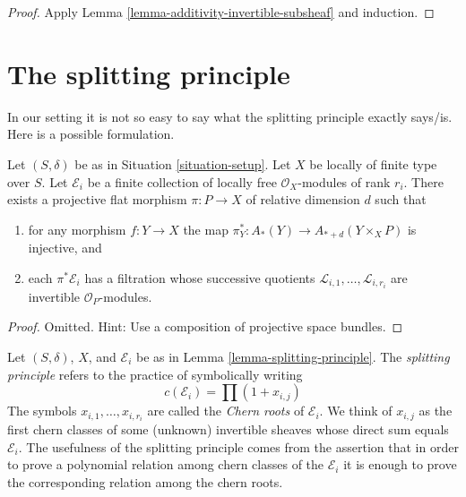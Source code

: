 \begin{proof}
Apply Lemma \ref{lemma-additivity-invertible-subsheaf} and induction.
\end{proof}





\section{The splitting principle}
\label{section-splitting-principle}

\noindent
In our setting it is not so easy to say what the splitting principle
exactly says/is. Here is a possible formulation.

\begin{lemma}
\label{lemma-splitting-principle}
Let $(S, \delta)$ be as in Situation \ref{situation-setup}. Let $X$ be locally
of finite type over $S$. Let $\mathcal{E}_i$ be a finite collection of
locally free $\mathcal{O}_X$-modules of rank $r_i$. There exists a projective
flat morphism $\pi : P \to X$ of relative dimension $d$ such that
\begin{enumerate}
\item for any morphism $f : Y \to X$ the map
$\pi_Y^* : A_*(Y) \to A_{* + d}(Y \times_X P)$ is injective, and
\item each $\pi^*\mathcal{E}_i$ has a filtration
whose successive quotients $\mathcal{L}_{i, 1}, \ldots, \mathcal{L}_{i, r_i}$
are invertible ${\mathcal O}_P$-modules.
\end{enumerate}
\end{lemma}

\begin{proof}
Omitted. Hint: Use a composition of projective space bundles.
\end{proof}

\noindent
Let $(S, \delta)$, $X$, and $\mathcal{E}_i$ be as in
Lemma \ref{lemma-splitting-principle}.
The {\it splitting principle} refers to the practice of symbolically writing
$$
c(\mathcal{E}_i) = \prod (1 + x_{i, j})
$$
The symbols $x_{i, 1}, \ldots, x_{i, r_i}$ are called the {\it Chern roots}
of $\mathcal{E}_i$. We think of $x_{i, j}$ as the first chern classes
of some (unknown) invertible sheaves whose direct sum equals $\mathcal{E}_i$.
The usefulness of the splitting principle comes from the assertion
that in order to prove a polynomial relation
among chern classes of the $\mathcal{E}_i$ it is enough to prove the
corresponding relation among the chern roots.


